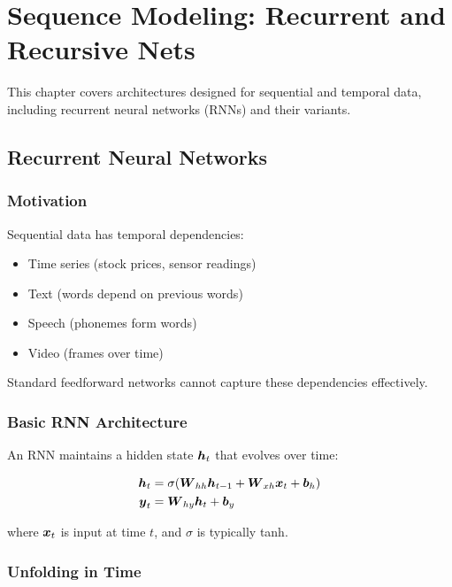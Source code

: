 
\chapter{Sequence Modeling: Recurrent and Recursive Nets}
\label{chap:sequence-modeling}

This chapter covers architectures designed for sequential and temporal data, including recurrent neural networks (RNNs) and their variants.

\section{Recurrent Neural Networks}
\label{sec:rnns}

\subsection{Motivation}

Sequential data has temporal dependencies:
\begin{itemize}
    \item Time series (stock prices, sensor readings)
    \item Text (words depend on previous words)
    \item Speech (phonemes form words)
    \item Video (frames over time)
\end{itemize}

Standard feedforward networks cannot capture these dependencies effectively.

\subsection{Basic RNN Architecture}

An RNN maintains a hidden state $\boldsymbol{h}_t$ that evolves over time:

\begin{align}
\boldsymbol{h}_t &= \sigma(\boldsymbol{W}_{hh} \boldsymbol{h}_{t-1} + \boldsymbol{W}_{xh} \boldsymbol{x}_t + \boldsymbol{b}_h) \\
\boldsymbol{y}_t &= \boldsymbol{W}_{hy} \boldsymbol{h}_t + \boldsymbol{b}_y
\end{align}

where $\boldsymbol{x}_t$ is input at time $t$, and $\sigma$ is typically tanh.

\subsection{Unfolding in Time}

